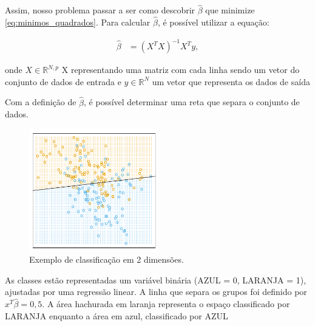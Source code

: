 Assim, nosso problema passar a ser como descobrir \begin{math}\hat{\beta}\end{math} que minimize \ref{eq:minimos_quadrados}. Para calcular \begin{math}\hat{\beta}\end{math}, é possível utilizar a equação:

\begin{equation}
  \label{eq:solucao_minimos_quadrados}
  \begin{aligned}
\hat{\beta} &= (X^{T}X)^{-1}X^{T}y, 
  \end{aligned}  
\end{equation}

onde \begin{math} X \in \mathbb{R}^{N,p} \end{math} X representando uma matriz com cada linha sendo um vetor do conjunto de dados de entrada e \begin{math}y \in \mathbb{R}^{N}\end{math} um vetor que representa os dados de saída \footnotemark {}

Com a definição de \begin{math}\hat{\beta}\end{math}, é possível determinar uma reta que separa o conjunto de dados.

\begin{figure}[!ht]
\caption{Exemplo de classificação em 2 dimensões.}
\centerline{\includegraphics[width=0.5\textwidth]{img/hiperplano}}
\end{figure}

 As classes estão representadas um variável binária (AZUL = 0, LARANJA = 1), ajustadas por uma regressão linear. A linha que separa os grupos foi definido por \begin{math}x^{T}\hat{\beta} = 0,5\end{math}. A área hachurada em laranja representa o espaço classificado por LARANJA enquanto a área em azul, classificado por AZUL

